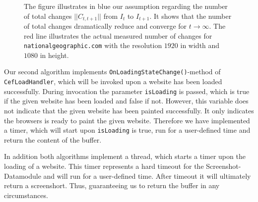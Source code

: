 \begin{figure}
	\centering
	
	\caption[Figure on total number of changes on a website]{The figure illustrates in blue our assumption regarding the number of total changes $|| C_{t,t+1}||$ from $I_{t}$ to $I_{t+1}$. It shows that the number of total changes dramatically reduce and converge for $t \rightarrow \infty$. The red line illustrates the actual measured number of changes for \texttt{nationalgeographic.com} with the resolution $1920$ in width and $1080$ in height. }
	\label{plot_assumption_number_changes}
\end{figure}

Our second algorithm implements \texttt{OnLoadingStateChange()}-method of \texttt{CefLoadHandler}, which will be invoked upon a website has been loaded successfully. During invocation the parameter \texttt{isLoading} is passed, which is true if the given website has been loaded and false if not. However, this variable does not indicate that the given website has been painted successfully. It only indicates the browsers is ready to paint the given website. Therefore we have implemented a timer, which will start upon \texttt{isLoading} is true, run for a user-defined time and return the content of the buffer.

In addition both algorithms implement a thread, which starts a timer upon the loading of a website. This timer represents a hard timeout for the Screenshot-Datamodule and will run for a user-defined time. After timeout it will ultimately return a screenshort. Thus, guaranteeing us to return the buffer  in any circumstances.

